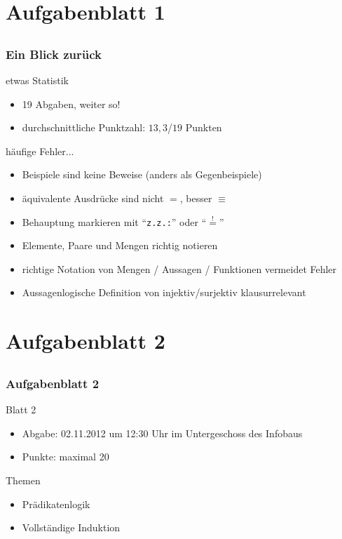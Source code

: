 
\section[Blatt 1]{Aufgabenblatt 1}
\subsection*{}
\begin{frame}
	\frametitle{Ein Blick zurück}
	\begin{block}{etwas Statistik}
		\begin{itemize}
			\item 19 Abgaben, weiter so!
			\item durchschnittliche Punktzahl: $13,3$/$19$ Punkten 
		\end{itemize}
	\end{block}

	\begin{block}{häufige Fehler...}
		\begin{itemize}
			\item[1.2:] Beispiele sind keine Beweise (anders als Gegenbeispiele) \pause
			\item[] äquivalente Ausdrücke sind nicht $=$, besser $\equiv$ \pause
			\item[] Behauptung markieren mit ``\texttt{z.z.:}'' oder ``$\overset{!}{=}$'' \pause
			\item[] Elemente, Paare und Mengen richtig notieren \pause
			\item[] richtige Notation von Mengen / Aussagen / Funktionen vermeidet Fehler \pause
			\item[] Aussagenlogische Definition von injektiv/surjektiv klausurrelevant
		 \end{itemize}
	\end{block}
\end{frame}

\section[Blatt 2]{Aufgabenblatt 2}
\subsection*{}
\begin{frame}
        \frametitle{Aufgabenblatt 2}
        \begin{block}{Blatt 2}
					\begin{itemize}
						\item Abgabe: 02.11.2012 um 12:30 Uhr im Untergeschoss des Infobaus
						\item Punkte: maximal 20
					\end{itemize}
        \end{block}
        \begin{block}{Themen}
        \begin{itemize}
        \item Prädikatenlogik 
        	\item Vollständige Induktion
        \end{itemize}
        \end{block}
\end{frame}
